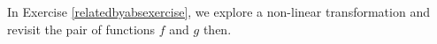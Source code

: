 \documentclass{ximera}
\begin{document}
In Exercise \ref{relatedbyabsexercise}, we explore a non-linear transformation and revisit the pair of functions $f$ and $g$ then.



 
 
 
 
 
 
 
 
 
 
 
 
 
 
 
 
 

\end{document}
